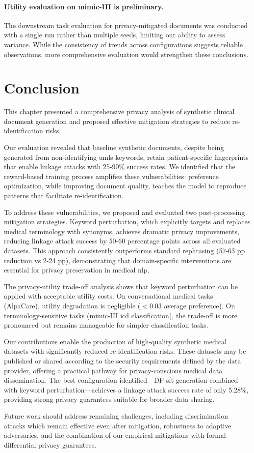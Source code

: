 \paragraph{Utility evaluation on \gls{mimic}-III is preliminary.} The downstream task evaluation for privacy-mitigated documents was conducted with a single run rather than multiple seeds, limiting our ability to assess variance. While the consistency of trends across configurations suggests reliable observations, more comprehensive evaluation would strengthen these conclusions.

\section{Conclusion}
\label{sec:privacy_conclusion}

This chapter presented a comprehensive privacy analysis of synthetic clinical document generation and proposed effective mitigation strategies to reduce re-identification risks.

Our evaluation revealed that baseline synthetic documents, despite being generated from non-identifying \gls{umls} keywords, retain patient-specific fingerprints that enable linkage attacks with 25-90\% success rates. We identified that the reward-based training process amplifies these vulnerabilities: preference optimization, while improving document quality, teaches the model to reproduce patterns that facilitate re-identification.

To address these vulnerabilities, we proposed and evaluated two post-processing mitigation strategies. Keyword perturbation, which explicitly targets and replaces medical terminology with synonyms, achieves dramatic privacy improvements, reducing linkage attack success by 50-60 percentage points across all evaluated datasets. This approach consistently outperforms standard rephrasing (57-63 pp reduction vs 2-24 pp), demonstrating that domain-specific interventions are essential for privacy preservation in medical \gls{nlp}.

The privacy-utility trade-off analysis shows that keyword perturbation can be applied with acceptable utility costs. On conversational medical tasks (AlpaCare), utility degradation is negligible ($<$0.03 average preference). On terminology-sensitive tasks (\gls{mimic}-III \gls{icd} classification), the trade-off is more pronounced but remains manageable for simpler classification tasks.

Our contributions enable the production of high-quality synthetic medical datasets with significantly reduced re-identification risks. These datasets may be published or shared according to the security requirements defined by the data provider, offering a practical pathway for privacy-conscious medical data dissemination. The best configuration identified—DP-\gls{sft} generation combined with keyword perturbation—achieves a linkage attack success rate of only 5.28\%, providing strong privacy guarantees suitable for broader data sharing.

Future work should address remaining challenges, including discrimination attacks which remain effective even after mitigation, robustness to adaptive adversaries, and the combination of our empirical mitigations with formal differential privacy guarantees.
